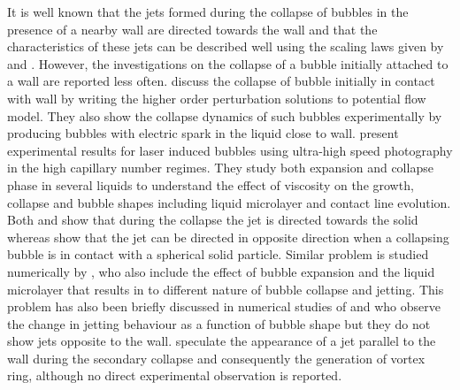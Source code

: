 \documentclass[final]{jfm}
\begin{document}
It is well known that the jets formed during the collapse of bubbles in the presence of a nearby wall are directed towards the wall and that the characteristics of these jets can be described well using the scaling laws given by \citet{popinet2002bubble} and \citet{supponen2017collapse}. However, the investigations on the collapse of a bubble initially attached to a wall are reported less often. \citet{naude1961mechanism} discuss the collapse of bubble initially in contact with wall by writing the higher order perturbation solutions to potential flow model. They also show the collapse dynamics of such bubbles experimentally by producing bubbles with electric spark in the liquid close to wall. \citet{hupfeld2020dynamics} present experimental results for laser induced bubbles using ultra-high speed photography in the high capillary number regimes. They study both expansion and collapse phase in several liquids to understand the effect of viscosity on the growth, collapse and bubble shapes including liquid microlayer and contact line evolution. Both \citet{naude1961mechanism} and \citet{hupfeld2020dynamics} show that during the collapse the jet is directed towards the solid whereas \citet{li2018transient} show that the jet can be directed in opposite direction when a collapsing bubble is in contact with a spherical solid particle. Similar problem is studied numerically by \citet{lechner2020jet}, who also include the effect of bubble expansion and the liquid microlayer that results in to different nature of bubble collapse and jetting. This problem has also been briefly discussed in numerical studies of \citet{lauer2012numerical} and \citet{koukouvinis2016compressible} who observe the change in jetting behaviour as a function of bubble shape but they do not show jets opposite to the wall. \citet{reuter2017} speculate the appearance of a jet parallel to the wall during the secondary collapse and consequently the generation of vortex ring, although no direct experimental observation is reported.\\
\end{document}

